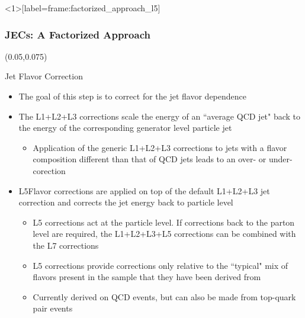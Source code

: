 \begin{frame}<1>[label=frame:factorized_approach_l5]
	\frametitle{JECs: A Factorized Approach}
        \begin{textblock}{.9}(0.05,0.075)
		\begin{figure}
			\label{fig:factorized_approach}
		\end{figure}
	\end{textblock}
	\vspace*{2.3cm}
	\begin{block}{Jet Flavor Correction}
		\begin{itemize}
		\footnotesize
		\item The goal of this step is to correct for the jet flavor dependence
		\item The L1+L2+L3 corrections scale the energy of an ``average QCD jet" back to the energy of the corresponding generator level particle jet
		\begin{itemize}
			\footnotesize
			\item Application of the generic L1+L2+L3 corrections to jets with a flavor composition different than that of QCD jets leads to an over- or under-corection
		\end{itemize}
		\item L5Flavor corrections are applied on top of the default L1+L2+L3 jet correction and corrects the jet energy back to particle level
			\begin{itemize}
				\footnotesize
				\item L5 corrections act at the particle level. If corrections back to the parton level are required, the L1+L2+L3+L5 corrections can be combined with the L7 corrections
				\item L5 corrections provide corrections only relative to the ``typical" mix of flavors present in the sample that they have been derived from
				\item Currently derived on QCD events, but can also be made from top-quark pair events
			\end{itemize}
		\end{itemize}

\end{block}
\end{frame}
